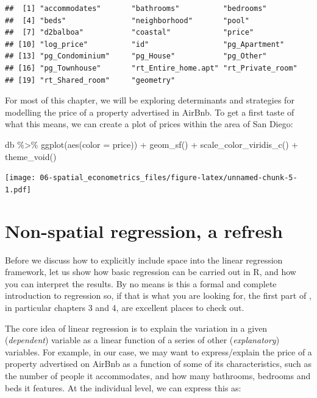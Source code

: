 \documentclass[
]{book}
\newenvironment{Shaded}{\begin{snugshade}}{\end{snugshade}}
\newcommand{\AttributeTok}[1]{\textcolor[rgb]{0.77,0.63,0.00}{#1}}
\newcommand{\FunctionTok}[1]{\textcolor[rgb]{0.00,0.00,0.00}{#1}}
\newcommand{\NormalTok}[1]{#1}
\newcommand{\SpecialCharTok}[1]{\textcolor[rgb]{0.00,0.00,0.00}{#1}}
\begin{document}
\begin{verbatim}
##  [1] "accommodates"       "bathrooms"          "bedrooms"          
##  [4] "beds"               "neighborhood"       "pool"              
##  [7] "d2balboa"           "coastal"            "price"             
## [10] "log_price"          "id"                 "pg_Apartment"      
## [13] "pg_Condominium"     "pg_House"           "pg_Other"          
## [16] "pg_Townhouse"       "rt_Entire_home.apt" "rt_Private_room"   
## [19] "rt_Shared_room"     "geometry"
\end{verbatim}

For most of this chapter, we will be exploring determinants and strategies for modelling the price of a property advertised in AirBnb. To get a first taste of what this means, we can create a plot of prices within the area of San Diego:

\begin{Shaded}
\begin{Highlighting}[]
\NormalTok{db }\SpecialCharTok{\%\textgreater{}\%}
  \FunctionTok{ggplot}\NormalTok{(}\FunctionTok{aes}\NormalTok{(}\AttributeTok{color =}\NormalTok{ price)) }\SpecialCharTok{+}
  \FunctionTok{geom\_sf}\NormalTok{() }\SpecialCharTok{+} 
  \FunctionTok{scale\_color\_viridis\_c}\NormalTok{() }\SpecialCharTok{+}
  \FunctionTok{theme\_void}\NormalTok{()}
\end{Highlighting}
\end{Shaded}

\texttt{[image: 06-spatial\_econometrics\_files/figure-latex/unnamed-chunk-5-1.pdf]}

\hypertarget{non-spatial-regression-a-refresh}{%
\section{Non-spatial regression, a refresh}\label{non-spatial-regression-a-refresh}}

Before we discuss how to explicitly include space into the linear regression framework, let us show how basic regression can be carried out in R, and how you can interpret the results. By no means is this a formal and complete introduction to regression so, if that is what you are looking for, the first part of \citet{gelman2006data}, in particular chapters 3 and 4, are excellent places to check out.

The core idea of linear regression is to explain the variation in a given (\emph{dependent}) variable as a linear function of a series of other (\emph{explanatory}) variables. For example, in our case, we may want to express/explain the price of a property advertised on AirBnb as a function of some of its characteristics, such as the number of people it accommodates, and how many bathrooms, bedrooms and beds it features. At the individual level, we can express this as:
\end{document}

